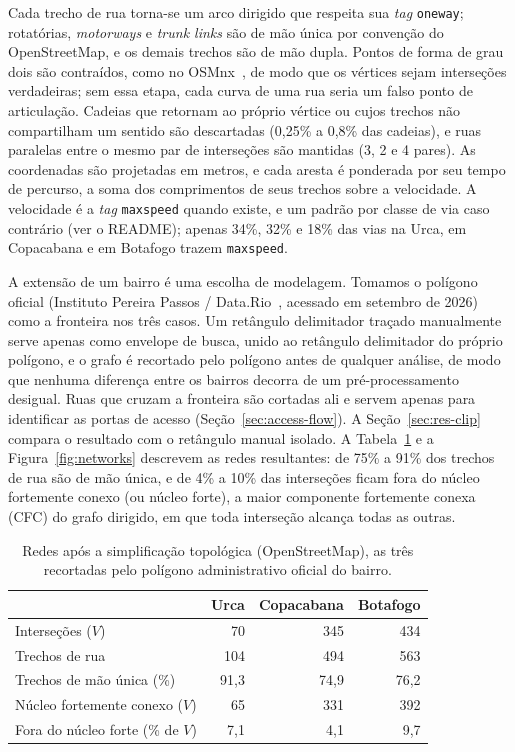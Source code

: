 Cada trecho de rua torna-se um arco dirigido que respeita sua
\emph{tag} \texttt{oneway}; rotatórias, \emph{motorways} e
\emph{trunk links} são de mão única por convenção do OpenStreetMap, e os
demais trechos são de mão dupla. Pontos de forma de grau dois são
contraídos, como no OSMnx~\cite{boeing}, de modo que os vértices sejam
interseções verdadeiras; sem essa etapa, cada curva de uma rua seria um
falso ponto de articulação. Cadeias que retornam ao próprio vértice ou
cujos trechos não compartilham um sentido são descartadas (0,25\% a
0,8\% das cadeias), e ruas paralelas entre o mesmo par de interseções
são mantidas (3, 2 e 4 pares). As coordenadas são projetadas em metros, e
cada aresta é ponderada por seu tempo de percurso, a soma dos
comprimentos de seus trechos sobre a velocidade. A velocidade é a
\emph{tag} \texttt{maxspeed} quando existe, e um padrão por classe de
via caso contrário (ver o README); apenas 34\%, 32\% e 18\% das vias na
Urca, em Copacabana e em Botafogo trazem \texttt{maxspeed}.


A extensão de um bairro é uma escolha de modelagem. Tomamos o polígono
oficial (Instituto Pereira Passos / Data.Rio~\cite{ipp_bairros},
acessado em setembro de 2026) como a fronteira nos três casos. Um
retângulo delimitador traçado manualmente serve apenas como envelope de
busca, unido ao retângulo delimitador do próprio polígono, e o grafo é
recortado pelo polígono antes de qualquer análise, de modo que nenhuma
diferença entre os bairros decorra de um pré-processamento desigual.
Ruas que cruzam a fronteira são cortadas ali e servem apenas para
identificar as portas de acesso (Seção~\ref{sec:access-flow}). A
Seção~\ref{sec:res-clip} compara o resultado com o retângulo manual
isolado. A Tabela~\ref{tab:redes} e a Figura~\ref{fig:networks} descrevem as
redes resultantes: de 75\% a 91\% dos trechos de rua são de mão única, e
de 4\% a 10\% das interseções ficam fora do núcleo fortemente conexo (ou
núcleo forte), a maior componente fortemente conexa (CFC) do grafo
dirigido, em que toda interseção alcança todas as outras.

\begin{table}[t]
\centering
\caption{Redes após a simplificação topológica (OpenStreetMap), as três
recortadas pelo polígono administrativo oficial do bairro.}
\label{tab:redes}
\begin{tabular}{lrrr}
\toprule
 & Urca & Copacabana & Botafogo \\
\midrule
Interseções ($V$)                     & 70   & 345  & 434 \\
Trechos de rua                        & 104  & 494  & 563 \\
Trechos de mão única (\%)             & 91,3 & 74,9 & 76,2 \\
Núcleo fortemente conexo ($V$)        & 65   & 331  & 392 \\
Fora do núcleo forte (\% de $V$)    & 7,1  & 4,1  & 9,7 \\
\bottomrule
\end{tabular}
\end{table}


